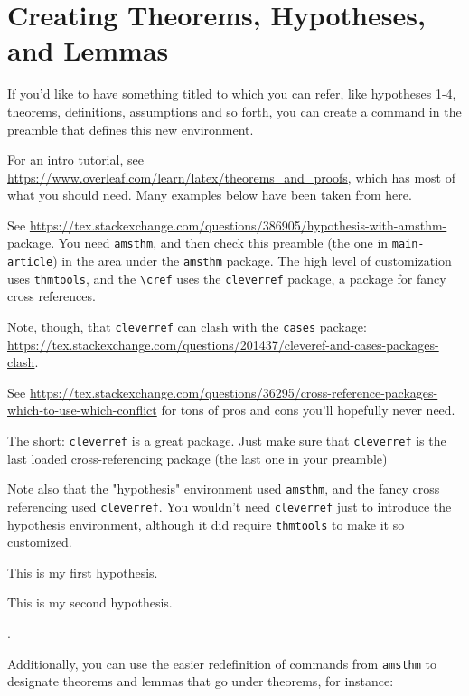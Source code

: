 \section{Creating Theorems, Hypotheses, and Lemmas}\label{theorems-hypotheses}

If you'd like to have something titled to which you can refer, like hypotheses 1-4, theorems, definitions, assumptions and so forth, you can create a command in the preamble that defines this new environment. 

For an intro tutorial, see \url{https://www.overleaf.com/learn/latex/theorems_and_proofs}, which has most of what you should need. Many examples below have been taken from here.

See \url{https://tex.stackexchange.com/questions/386905/hypothesis-with-amsthm-package}. You need \verb+amsthm+, and then check this preamble (the one in \verb+main-article+) in the area under the \verb+amsthm+ package. The high level of customization uses \verb+thmtools+, and the \verb+\cref+ uses the \verb+cleverref+ package, a package for fancy cross references. 

Note, though, that \verb+cleverref+ can clash with the \verb+cases+ package: \url{https://tex.stackexchange.com/questions/201437/cleveref-and-cases-packages-clash}. 

See \url{https://tex.stackexchange.com/questions/36295/cross-reference-packages-which-to-use-which-conflict} for tons of pros and cons you'll hopefully never need. 

The short: \verb+cleverref+ is a great package. Just make sure that \verb+cleverref+ is the last loaded cross-referencing package (the last one in your preamble)

Note also that the "hypothesis" environment used \verb+amsthm+, and the fancy cross referencing used \verb+cleverref+. You wouldn't need \verb+cleverref+ just to introduce the hypothesis environment, although it did require \verb+thmtools+ to make it so customized.

 \begin{hyp} \label{hyp:a}This is my first hypothesis. \end{hyp}
 \begin{hyp} \label{hyp:b}This is my second hypothesis. \end{hyp}

  .

Additionally, you can use the easier redefinition of commands from \verb+amsthm+ to designate theorems and lemmas that go under theorems, for instance:




